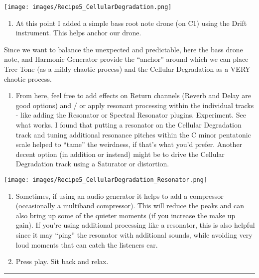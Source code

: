 \documentclass[
  12pt,
  letterpaper,
  oneside,
  open=any]{scrbook}
\providecommand{\tightlist}{%
  \setlength{\itemsep}{0pt}\setlength{\parskip}{0pt}}\usepackage{longtable,booktabs,array}
\begin{document}
\texttt{[image: images/Recipe5\_CellularDegradation.png]}

\begin{enumerate}
\def\labelenumi{\arabic{enumi}.}
\setcounter{enumi}{3}
\tightlist
\item
  At this point I added a simple bass root note drone (on C1) using the
  Drift instrument. This helps anchor our drone.
\end{enumerate}

Since we want to balance the unexpected and predictable, here the bass
drone note, and Harmonic Generator provide the ``anchor'' around which
we can place Tree Tone (as a mildy chaotic process) and the Cellular
Degradation as a VERY chaotic process.

\begin{enumerate}
\def\labelenumi{\arabic{enumi}.}
\setcounter{enumi}{4}
\tightlist
\item
  From here, feel free to add effects on Return channels (Reverb and
  Delay are good options) and / or apply resonant processing within the
  individual tracks - like adding the Resonator or Spectral Resonator
  plugins. Experiment. See what works. I found that putting a resonator
  on the Cellular Degradation track and tuning additional resonance
  pitches within the C minor pentatonic scale helped to ``tame'' the
  weirdness, if that's what you'd prefer. Another decent option (in
  addition or instead) might be to drive the Cellular Degradation track
  using a Saturator or distortion.
\end{enumerate}

\texttt{[image: images/Recipe5\_CellularDegradation\_Resonator.png]}

\begin{enumerate}
\def\labelenumi{\arabic{enumi}.}
\setcounter{enumi}{5}
\item
  Sometimes, if using an audio generator it helps to add a compressor
  (occasionally a multiband compressor). This will reduce the peaks and
  can also bring up some of the quieter moments (if you increase the
  make up gain). If you're using additional processing like a resonator,
  this is also helpful since it may ``ping'' the resonator with
  additional sounds, while avoiding very loud moments that can catch the
  listeners ear.
\item
  Press play. Sit back and relax.
\end{enumerate}

\begin{center}\rule{0.5\linewidth}{0.5pt}\end{center}
\end{document}
